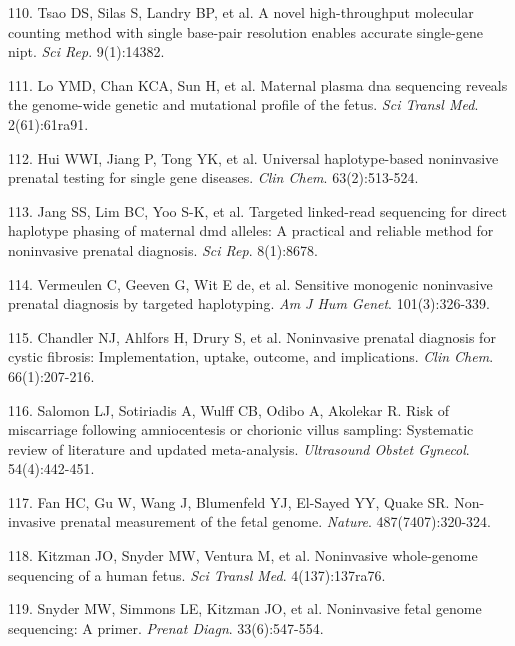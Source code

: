\documentclass[11pt,letterpaper]{book}
\begin{document}
\leavevmode\hypertarget{ref-tsao:2019ab}{}%
110. Tsao DS, Silas S, Landry BP, et al. A novel high-throughput molecular counting method with single base-pair resolution enables accurate single-gene nipt. \emph{Sci Rep}. 9(1):14382.

\leavevmode\hypertarget{ref-lo:2010aa}{}%
111. Lo YMD, Chan KCA, Sun H, et al. Maternal plasma dna sequencing reveals the genome-wide genetic and mutational profile of the fetus. \emph{Sci Transl Med}. 2(61):61ra91.

\leavevmode\hypertarget{ref-hui:2017aa}{}%
112. Hui WWI, Jiang P, Tong YK, et al. Universal haplotype-based noninvasive prenatal testing for single gene diseases. \emph{Clin Chem}. 63(2):513-524.

\leavevmode\hypertarget{ref-jang:2018aa}{}%
113. Jang SS, Lim BC, Yoo S-K, et al. Targeted linked-read sequencing for direct haplotype phasing of maternal dmd alleles: A practical and reliable method for noninvasive prenatal diagnosis. \emph{Sci Rep}. 8(1):8678.

\leavevmode\hypertarget{ref-vermeulen:2017aa}{}%
114. Vermeulen C, Geeven G, Wit E de, et al. Sensitive monogenic noninvasive prenatal diagnosis by targeted haplotyping. \emph{Am J Hum Genet}. 101(3):326-339.

\leavevmode\hypertarget{ref-chandler:2020aa}{}%
115. Chandler NJ, Ahlfors H, Drury S, et al. Noninvasive prenatal diagnosis for cystic fibrosis: Implementation, uptake, outcome, and implications. \emph{Clin Chem}. 66(1):207-216.

\leavevmode\hypertarget{ref-salomon:2019aa}{}%
116. Salomon LJ, Sotiriadis A, Wulff CB, Odibo A, Akolekar R. Risk of miscarriage following amniocentesis or chorionic villus sampling: Systematic review of literature and updated meta-analysis. \emph{Ultrasound Obstet Gynecol}. 54(4):442-451.

\leavevmode\hypertarget{ref-fan:2012aa}{}%
117. Fan HC, Gu W, Wang J, Blumenfeld YJ, El-Sayed YY, Quake SR. Non-invasive prenatal measurement of the fetal genome. \emph{Nature}. 487(7407):320-324.

\leavevmode\hypertarget{ref-kitzman:2012aa}{}%
118. Kitzman JO, Snyder MW, Ventura M, et al. Noninvasive whole-genome sequencing of a human fetus. \emph{Sci Transl Med}. 4(137):137ra76.

\leavevmode\hypertarget{ref-snyder:2013aa}{}%
119. Snyder MW, Simmons LE, Kitzman JO, et al. Noninvasive fetal genome sequencing: A primer. \emph{Prenat Diagn}. 33(6):547-554.
\end{document}
